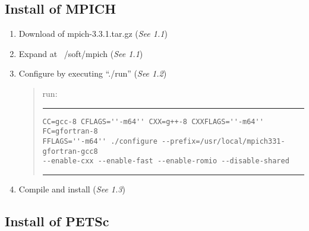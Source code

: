 \documentclass[11pt]{article}
\begin{document}
\subsection{Install of MPICH}

\begin{enumerate}
\item
Download of mpich-3.3.1.tar.gz \qquad (\textit{See 1.1})
\item
Expand at ~/soft/mpich \qquad (\textit{See 1.1})
\item
Configure by executing ``./run''  \qquad (\textit{See 1.2})

\begin{quote}
run:
\hrule
\begin{verbatim}
CC=gcc-8 CFLAGS=''-m64'' CXX=g++-8 CXXFLAGS=''-m64'' FC=gfortran-8
FFLAGS=''-m64'' ./configure --prefix=/usr/local/mpich331-gfortran-gcc8
--enable-cxx --enable-fast --enable-romio --disable-shared
\end{verbatim}
\hrule
\end{quote}

\item
Compile and install \qquad (\textit{See 1.3})
\end{enumerate}

\subsection{Install of PETSc}
\end{document}

